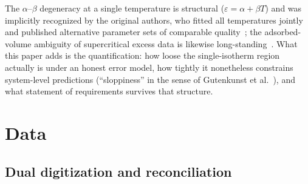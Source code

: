 \documentclass[preprint,12pt]{elsarticle}
\begin{document}
The $\alpha$--$\beta$ degeneracy at a single temperature is structural
($\varepsilon=\alpha+\beta T$) and was implicitly recognized by the original
authors, who fitted all temperatures jointly and published alternative
parameter sets of comparable quality~\cite{richard2009a}; the
adsorbed-volume ambiguity of supercritical excess data is likewise
long-standing~\cite{myers2014}. What this paper adds is the quantification:
how loose the single-isotherm region actually is under an honest error
model, how tightly it nonetheless constrains system-level predictions
(``sloppiness'' in the sense of Gutenkunst et
al.~\cite{gutenkunst2007}), and what statement of requirements survives
that structure.

\section{Data}

\subsection{Dual digitization and reconciliation}
\end{document}
